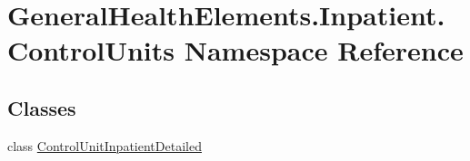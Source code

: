 \hypertarget{namespace_general_health_elements_1_1_inpatient_1_1_control_units}{}\section{General\+Health\+Elements.\+Inpatient.\+Control\+Units Namespace Reference}
\label{namespace_general_health_elements_1_1_inpatient_1_1_control_units}
\subsection*{Classes}
\begin{DoxyCompactItemize}
\item 
class \hyperlink{class_general_health_elements_1_1_inpatient_1_1_control_units_1_1_control_unit_inpatient_detailed}{Control\+Unit\+Inpatient\+Detailed}
\end{DoxyCompactItemize}
